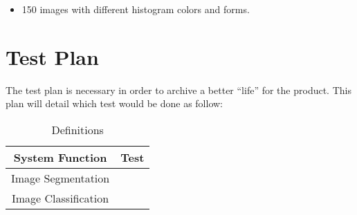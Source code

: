\documentclass[12pt]{article}
\begin{document}
\begin{itemize}
  \item 150 images with different histogram colors and forms.
\end{itemize}

\section{Test Plan}
The test plan is necessary in order to archive a better “life” for the product. This plan will detail which test would be done as follow:

\begin{table}[H]\centering
\begin{tabular}{|c|c|}
  \hline
    System Function & Test \\
   \hline
   Image Segmentation  & \\
   \hline
    Image Classification  & \\
   \hline
\end{tabular}
\caption{Definitions}
\end{table}
\end{document}
